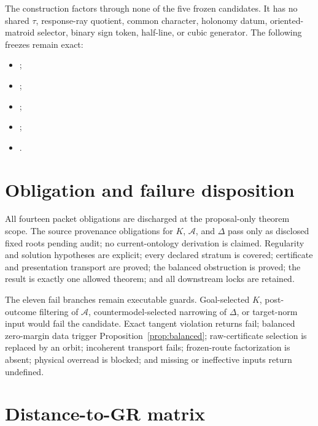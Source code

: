 \documentclass[11pt]{article}
\begin{document}
The construction factors through none of the five frozen candidates.  It has
no shared \(\tau\), response-ray quotient, common character, holonomy datum,
oriented-matroid selector, binary sign token, half-line, or cubic generator.
The following freezes remain exact:
\begin{itemize}
  \item {};
  \item {};
  \item {};
  \item {};
  \item {}.
\end{itemize}

\section{Obligation and failure disposition}

All fourteen packet obligations are discharged at the proposal-only theorem
scope.  The source provenance obligations for \(K\), \(\mathcal A\), and
\(\Delta\) pass only as disclosed fixed roots pending audit; no
current-ontology derivation is claimed.  Regularity and solution hypotheses
are explicit; every declared stratum is covered; certificate and presentation
transport are proved; the balanced obstruction is proved; the result is
exactly one allowed theorem; and all downstream locks are retained.

The eleven fail branches remain executable guards.  Goal-selected \(K\),
post-outcome filtering of \(\mathcal A\), countermodel-selected narrowing of
\(\Delta\), or target-norm input would fail the candidate.  Exact tangent
violation returns fail; balanced zero-margin data trigger
Proposition~\ref{prop:balanced}; raw-certificate selection is replaced by an
orbit; incoherent transport fails; frozen-route factorization is absent;
physical overread is blocked; and missing or ineffective inputs return
undefined.

\section{Distance-to-GR matrix}
\end{document}
